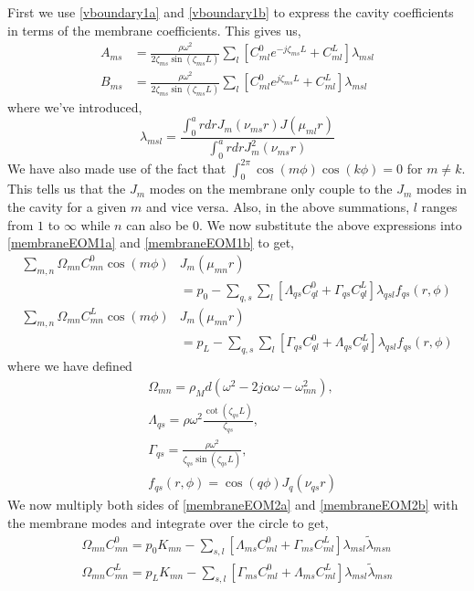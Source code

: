 \documentclass[a4paper,10pt]{article}
\begin{document}
First we use \eqref{vboundary1a} and \eqref{vboundary1b} to express the cavity coefficients in terms
of the membrane coefficients. This gives us,
\begin{align}
 A_{ms}&=\frac{\rho\omega^2}{2\zeta_{ms}\sin(\zeta_{ms}L)}\sum_{l}\left[C^0_{ml}e^{-j\zeta_{ms}L}+C^L_{ml}\right]\lambda_{msl}\\
 B_{ms}&=\frac{\rho\omega^2}{2\zeta_{ms}\sin(\zeta_{ms}L)}\sum_{l}\left[C^0_{ml}e^{j\zeta_{ms}L}+C^L_{ml}\right]\lambda_{msl}
\end{align}
where we've introduced,
\begin{equation*}
 \lambda_{msl}=\frac{\int^a_0 rdr J_m(\nu_{ms}r)J(\mu_{ml}r)}{\int^a_0 rdrJ^2_m(\nu_{ms}r)}
\end{equation*}
We have also made use of the fact that $\int_0^{2\pi}\cos(m\phi)\cos(k\phi)=0$ for $m\neq k$. This tells
us that the $J_m$ modes on the membrane only couple to the $J_m$ modes in the cavity for a given $m$ and vice
versa. Also, in the above summations, $l$ ranges from $1$ to $\infty$ while $n$ can also be $0$.
We now substitute the above expressions into \eqref{membraneEOM1a} and \eqref{membraneEOM1b} to get,
\begin{align}
 \sum_{m,n}\Omega_{mn}C^0_{mn}\cos(m\phi)&J_m(\mu_{mn}r)\nonumber\\
 &=p_0-\sum_{q,s}\sum_{l}\left[\Lambda_{qs}C^0_{ql}+\Gamma_{qs}C^L_{ql}\right]\lambda_{qsl}f_{qs}(r,\phi)\label{membraneEOM2a}\\
 \sum_{m,n}\Omega_{mn}C^L_{mn}\cos(m\phi)&J_m(\mu_{mn}r)\nonumber\\
 &=p_L-\sum_{q,s}\sum_{l}\left[\Gamma_{qs}C^0_{ql}+\Lambda_{qs}C^L_{ql}\right]\lambda_{qsl}f_{qs}(r,\phi)\label{membraneEOM2b}
\end{align}
where we have defined
\begin{align}
 &\Omega_{mn}=\rho_M d\left(\omega^2-2j\alpha\omega-\omega^2_{mn}\right),\\
 &\Lambda_{qs}=\rho\omega^2 \frac{\cot(\zeta_{qs}L)}{\zeta_{qs}},\\
 &\Gamma_{qs}=\frac{\rho\omega^2}{\zeta_{qs}\sin(\zeta_{qs}L)},\\
 &f_{qs}(r,\phi)=\cos(q\phi)J_q(\nu_{qs}r)
\end{align}
We now multiply both sides of \eqref{membraneEOM2a} and \eqref{membraneEOM2b} with the membrane modes and
integrate over the circle to get,
\begin{align}
 \Omega_{mn}C^0_{mn}=p_0K_{mn}-\sum_{s,l}\left[\Lambda_{ms}C^0_{ml}+\Gamma_{ms}C^L_{ml}\right]\lambda_{msl}\widetilde{\lambda}_{msn}\\
 \Omega_{mn}C^L_{mn}=p_LK_{mn}-\sum_{s,l}\left[\Gamma_{ms}C^0_{ml}+\Lambda_{ms}C^L_{ml}\right]\lambda_{msl}\widetilde{\lambda}_{msn}
\end{align}
\end{document}
